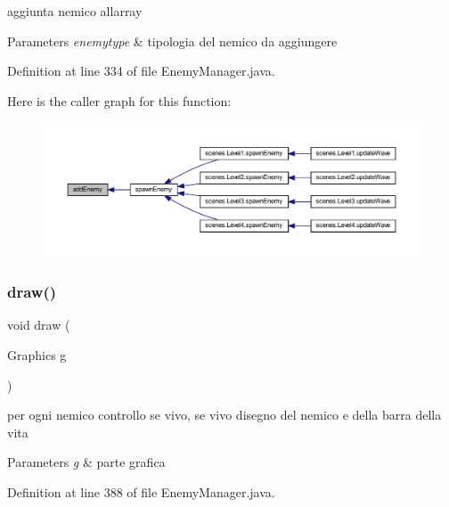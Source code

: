 aggiunta nemico all\textquotesingle{}array 


\begin{DoxyParams}{Parameters}
{\em enemytype} & tipologia del nemico da aggiungere \\
\hline
\end{DoxyParams}


Definition at line 334 of file Enemy\+Manager.\+java.

Here is the caller graph for this function\+:
\nopagebreak
\begin{figure}[H]
\begin{center}
\leavevmode
\includegraphics[width=350pt]{classmanagers_1_1_enemy_manager_a24695d90cee943c6c64c2d9f1b231285_icgraph}
\end{center}
\end{figure}
\mbox{\label{classmanagers_1_1_enemy_manager_a72fe1ffca978e99fd16994a10e7f8051}} 
\subsubsection{\texorpdfstring{draw()}{draw()}}
{\footnotesize\ttfamily void draw (\begin{DoxyParamCaption}\item[{Graphics}]{g }\end{DoxyParamCaption})}



per ogni nemico controllo se vivo, se vivo disegno del nemico e della barra della vita 


\begin{DoxyParams}{Parameters}
{\em g} & parte grafica \\
\hline
\end{DoxyParams}


Definition at line 388 of file Enemy\+Manager.\+java.

